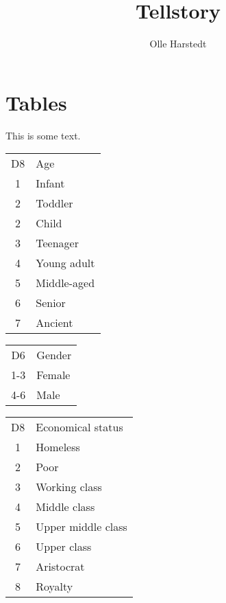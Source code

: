 \documentclass[11pt,a4paper,twocolumn]{article}
\title{Tellstory}
\author{Olle Harstedt}
\begin{document}
\maketitle
\section{Tables}
This is some text.

\begin{tabular}{cl}
    \rowcolor{gray!50}
    D8 & Age\\
    1 & Infant\\
    2 & Toddler\\
    2 & Child\\
    3 & Teenager\\
    4 & Young adult\\
    5 & Middle-aged\\
    6 & Senior\\
    7 & Ancient\\
\end{tabular}

\begin{tabular}{cl}
    \rowcolor{gray!50}
    D6 & Gender\\
    1-3 & Female\\
    4-6 & Male\\
\end{tabular}

\begin{tabular}{cl}
    \rowcolor{gray!50}
    D8 & Economical status\\
    1 & Homeless\\
    2 & Poor\\
    3 & Working class\\
    4 & Middle class\\
    5 & Upper middle class\\
    6 & Upper class\\
    7 & Aristocrat\\
    8 & Royalty\\
\end{tabular}
\end{document}
